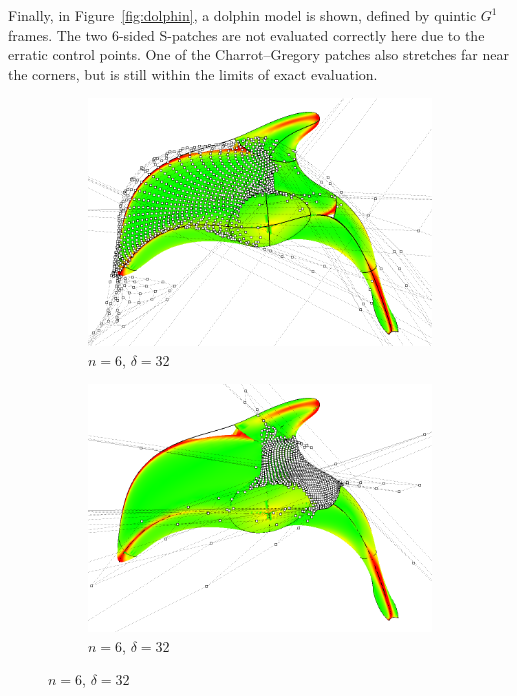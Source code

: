 \documentclass[9pt,academicons]{article}
\begin{document}
Finally, in Figure~\ref{fig:dolphin}, a dolphin model
is shown, defined by quintic $G^1$ frames. The two 6-sided S-patches are
not evaluated correctly here due to the erratic control points.
One of the Charrot--Gregory patches also stretches far near the corners,
but is still within the limits of exact evaluation.
\begin{figure}[!ht]
  {
    \hfill
    \begin{subfigure}{.45\textwidth}
      \centering
      \includegraphics[width=\textwidth]{images/dolphin/spatch1.png}
      \caption{$n=6$, $\delta=32$}
      \label{fig:dolphin-3-sp}
    \end{subfigure}
    \hfill
    \begin{subfigure}{.45\textwidth}
      \centering
      \includegraphics[width=\textwidth]{images/dolphin/spatch2.png}
      \caption{$n=6$, $\delta=32$}
      \label{fig:dolphin-5-sp}
    \end{subfigure}
    \hfill
  }


\end{figure}
\end{document}
